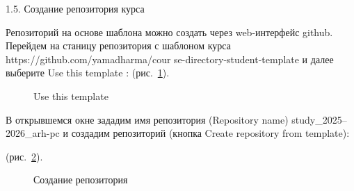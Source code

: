 \documentclass[
  english,
  russian,
  12pt,
  a4paper,
  DIV=11,
  numbers=noendperiod]{scrreprt}
\begin{document}
1.5. Создание репозитория курса

Репозиторий на основе шаблона можно создать через web-интерфейс github.
Перейдем на станицу репозитория с шаблоном курса
https://github.com/yamadharma/cour se-directory-student-template и далее
выберите Use this template : (рис.~\ref{fig-007}).

\begin{figure}


\caption{\label{fig-007}Use this template}

\end{figure}%

В открывшемся окне зададим имя репозитория (Repository name)
study\_2025-- 2026\_arh-pc и создадим репозиторий (кнопка Create
repository from template):

(рис.~\ref{fig-008}).

\begin{figure}


\caption{\label{fig-008}Создание репозитория}

\end{figure}%
\end{document}
